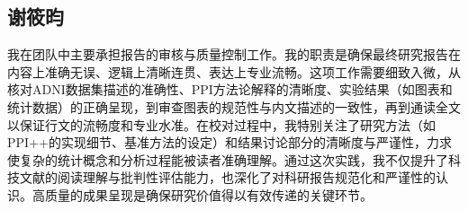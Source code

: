 \documentclass[12pt,a4paper]{article}
\begin{document}
\subsection{谢筱昀}

\indent 我在团队中主要承担报告的审核与质量控制工作。我的职责是确保最终研究报告在内容上准确无误、逻辑上清晰连贯、表达上专业流畅。这项工作需要细致入微，从核对ADNI数据集描述的准确性、PPI方法论解释的清晰度、实验结果（如图表和统计数据）的正确呈现，到审查图表的规范性与内文描述的一致性，再到通读全文以保证行文的流畅度和专业水准。在校对过程中，我特别关注了研究方法（如PPI++的实现细节、基准方法的设定）和结果讨论部分的清晰度与严谨性，力求使复杂的统计概念和分析过程能被读者准确理解。通过这次实践，我不仅提升了科技文献的阅读理解与批判性评估能力，也深化了对科研报告规范化和严谨性的认识。高质量的成果呈现是确保研究价值得以有效传递的关键环节。
\end{document}

